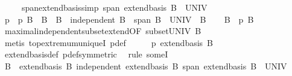 \begin{isabellebody}
\ \ \ \ \ span{\isacharunderscore}{\kern0pt}extend{\isacharunderscore}{\kern0pt}basis{\isacharbrackleft}{\kern0pt}simp{\isacharbrackright}{\kern0pt}{\isacharcolon}{\kern0pt}\ {\isachardoublequoteopen}span\ {\isacharparenleft}{\kern0pt}extend{\isacharunderscore}{\kern0pt}basis\ B{\isacharparenright}{\kern0pt}\ {\isacharequal}{\kern0pt}\ UNIV{\isachardoublequoteclose}\isanewline
%
\isadelimproof
%
\endisadelimproof
%
\isatagproof
{}\isamarkupfalse%
\ {\isacharminus}{\kern0pt}\isanewline
\ \ \isamarkupfalse%
\ p\ \ {\isachardoublequoteopen}p\ B{\isacharprime}{\kern0pt}\ {\isasymequiv}\ B\ {\isasymsubseteq}\ B{\isacharprime}{\kern0pt}\ {\isasymand}\ independent\ B{\isacharprime}{\kern0pt}\ {\isasymand}\ span\ B{\isacharprime}{\kern0pt}\ {\isacharequal}{\kern0pt}\ UNIV{\isachardoublequoteclose}\ \ B{\isacharprime}{\kern0pt}\isanewline
\ \ \isamarkupfalse%
\ B{\isacharprime}{\kern0pt}\ \ {\isachardoublequoteopen}p\ B{\isacharprime}{\kern0pt}{\isachardoublequoteclose}\isanewline
\ \ \ \ \isamarkupfalse%
\ maximal{\isacharunderscore}{\kern0pt}independent{\isacharunderscore}{\kern0pt}subset{\isacharunderscore}{\kern0pt}extend{\isacharbrackleft}{\kern0pt}OF\ subset{\isacharunderscore}{\kern0pt}UNIV\ B{\isacharbrackright}{\kern0pt}\isanewline
\ \ \ \ \isamarkupfalse%
\ {\isacharparenleft}{\kern0pt}metis\ top{\isachardot}{\kern0pt}extremum{\isacharunderscore}{\kern0pt}uniqueI\ p{\isacharunderscore}{\kern0pt}def{\isacharparenright}{\kern0pt}\isanewline
\ \ \isamarkupfalse%
\ \isamarkupfalse%
\ {\isachardoublequoteopen}p\ {\isacharparenleft}{\kern0pt}extend{\isacharunderscore}{\kern0pt}basis\ B{\isacharparenright}{\kern0pt}{\isachardoublequoteclose}\isanewline
\ \ \ \ \isamarkupfalse%
\ extend{\isacharunderscore}{\kern0pt}basis{\isacharunderscore}{\kern0pt}def\ p{\isacharunderscore}{\kern0pt}def{\isacharbrackleft}{\kern0pt}symmetric{\isacharbrackright}{\kern0pt}\ \isamarkupfalse%
\ {\isacharparenleft}{\kern0pt}rule\ someI{\isacharparenright}{\kern0pt}\isanewline
\ \ \isamarkupfalse%
\ \isamarkupfalse%
\ {\isachardoublequoteopen}B\ {\isasymsubseteq}\ extend{\isacharunderscore}{\kern0pt}basis\ B{\isachardoublequoteclose}\ {\isachardoublequoteopen}independent\ {\isacharparenleft}{\kern0pt}extend{\isacharunderscore}{\kern0pt}basis\ B{\isacharparenright}{\kern0pt}{\isachardoublequoteclose}\ {\isachardoublequoteopen}span\ {\isacharparenleft}{\kern0pt}extend{\isacharunderscore}{\kern0pt}basis\ B{\isacharparenright}{\kern0pt}\ {\isacharequal}{\kern0pt}\ UNIV{\isachardoublequoteclose}\isanewline

\end{isabellebody}
